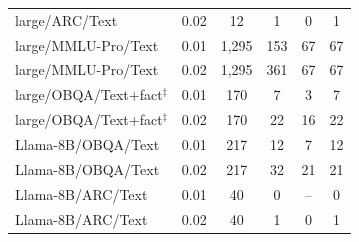 \begin{table}[!htbp]
\begin{tabular*}{\linewidth}{@{}l@{\hspace{5pt}\extracolsep{\fill}}ccccc@{}}
large/ARC/Text & 0.02 & 12 & 1 & 0 & 1\\
\addlinespace[2pt]
large/MMLU-Pro/Text & 0.01 & 1,295 & 153 & 67 & 67\\
large/MMLU-Pro/Text & 0.02 & 1,295 & 361 & 67 & 67\\
\addlinespace[2pt]
large/OBQA/Text+fact$^\ddagger$ & 0.01 & 170 & 7 & 3 & 7\\
large/OBQA/Text+fact$^\ddagger$ & 0.02 & 170 & 22 & 16 & 22\\
\addlinespace[2pt]
Llama-8B/OBQA/Text & 0.01 & 217 & 12 & 7 & 12\\
Llama-8B/OBQA/Text & 0.02 & 217 & 32 & 21 & 21\\
\addlinespace[2pt]
Llama-8B/ARC/Text & 0.01 & 40 & 0 & -- & 0\\
Llama-8B/ARC/Text & 0.02 & 40 & 1 & 0 & 1\\\bottomrule
\end{tabular*}
\end{table}

